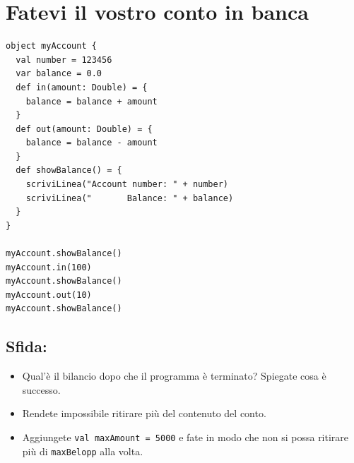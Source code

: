 \chapter{Fatevi il vostro conto in banca}
\begin{multicols}{2}

\begin{lstlisting}[basicstyle={\ttfamily\fontsize{16}{19}\selectfont},numbers=none]
object myAccount {
  val number = 123456
  var balance = 0.0
  def in(amount: Double) = {
    balance = balance + amount 
  }
  def out(amount: Double) = { 
    balance = balance - amount 
  }
  def showBalance() = {
    scriviLinea("Account number: " + number) 
    scriviLinea("       Balance: " + balance)
  }
}

myAccount.showBalance()
myAccount.in(100)
myAccount.showBalance()
myAccount.out(10)
myAccount.showBalance()
\end{lstlisting}
        


\columnbreak


\section*{\color{BrickRed}Sfida:}


\begin{itemize}

\item {Qual'è il bilancio dopo che il programma è terminato? Spiegate cosa è successo.}
\item {Rendete impossibile ritirare più del contenuto del conto.}
\item {Aggiungete \lstinline{val maxAmount = 5000} e fate in modo che non si possa ritirare più di \lstinline{maxBelopp} alla volta.}

\end{itemize}


\end{multicols}

